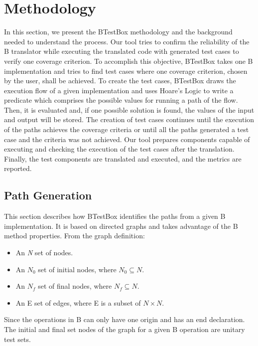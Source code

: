 \documentclass[runningheads]{llncs}
\begin{document}
\section{Methodology} \label{sec:BTestBox}

In this section, we present the BTestBox methodology and the background needed to understand the process. Our tool tries to confirm the reliability of the B translator while executing the translated code with generated test cases to verify one coverage criterion. To accomplish this objective, BTestBox takes one B implementation and tries to find test cases where one coverage criterion, chosen by the user, shall be achieved. To create the test cases, BTestBox draws the execution flow of a given implementation and uses Hoare's Logic to write a predicate which comprises the possible values for running a path of the flow. Then, it is evaluated and, if one possible solution is found, the values of the input and output will be stored. The creation of test cases continues until the execution of the paths achieves the coverage criteria or until all the paths generated a test case and the criteria was not achieved. Our tool prepares components capable of executing and checking the execution of the test cases after the translation. Finally, the test components are translated and executed, and the metrics are reported.

\subsection{Path Generation}

This section describes how BTestBox identifies the paths from a given B implementation. It is based on directed graphs and takes advantage of the B method properties. From the graph definition:

\begin{itemize}
    \item An \textit{N} set of nodes.
    \item An $N_0$ set of initial nodes, where $N_0 \subseteq N$.
    \item An $N_f$ set of final nodes, where $N_f \subseteq N$.
    \item An E set of edges, where E is a subset of $N \times N$.
\end{itemize}

Since the operations in B can only have one origin and has an end declaration. The initial and final set nodes of the graph for a given B operation are unitary test sets.
\end{document}
